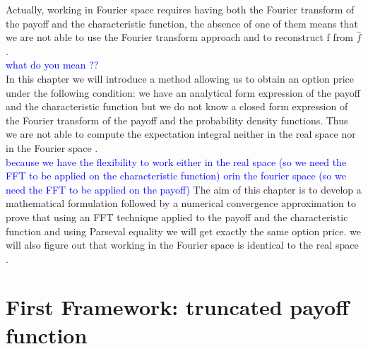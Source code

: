 \documentclass[12pt]{report}
\begin{document}
Actually, working in Fourier space  requires having both the Fourier transform of the payoff and the characteristic function, the absence of one of them means that we are not able to use  the Fourier transform approach and to reconstruct f from $\hat f$ . \\
 \textcolor{blue}{what do you mean ??}
\\

In this chapter we will introduce a method allowing us to obtain an option price under the following condition: we have an analytical form expression of the payoff and the characteristic function but we do not know a closed form expression of the Fourier transform of the payoff and the probability density functions. Thus we are not able to compute the expectation integral neither in the real space nor in the Fourier space .\\ 

\textcolor{blue}{because we have the flexibility to work either in the real space (so we need the FFT to be applied on the characteristic function) orin the fourier space (so we need the FFT to be applied on the payoff) } 
The aim of this chapter is to develop a mathematical formulation followed by a numerical convergence approximation to prove that using an FFT technique applied to the payoff and the characteristic function and using Parseval equality we will get exactly the same option price.  we will also figure out that working in the Fourier space is identical to the real space .

\section{First Framework: truncated payoff function}
\end{document}
